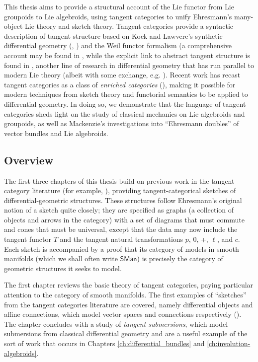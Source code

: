 This thesis aims to provide a structural account of the Lie functor from Lie groupoids to Lie algebroids, using tangent categories \cite{Cockett2014} to unify Ehresmann's many-object Lie theory and sketch theory. Tangent categories provide a syntactic description of tangent structure based on Kock and Lawvere's synthetic differential geometry (\cite{Kock2006}, \cite{Lawvere1979}) and the Weil functor formalism (a comprehensive account may be found in \cite{Kolar1993}, while the explicit link to abstract tangent structure is found in \cite{Leung2017}, another line of research in differential geometry that has run parallel to modern Lie theory (albeit with some exchange, e.g. \cite{kolar2007functorial}). Recent work has recast tangent categories as a class of \emph{enriched categories} (\cite{Garner2018}), making it possible for modern techniques from sketch theory and functorial semantics to be applied to differential geometry. In doing so, we demonstrate that the language of tangent categories sheds light on the study of classical mechanics on Lie algebroids and groupoids, as well as Mackenzie's investigations into ``Ehresmann doubles'' of vector bundles and Lie algebroids.

\subsection*{Overview}
The first three chapters of this thesis build on previous work in the tangent category literature (for example, \cite{Cockett2017,Cockett2018,LucyshynWright2018}), providing tangent-categorical sketches of differential-geometric structures.  These structures follow Ehresmann's original notion of a sketch quite closely; they are specified as graphs (a collection of objects and arrows in the category) with a set of diagrams that must commute and cones that must be universal, except that the data may now include the tangent functor $T$ and the tangent natural transformations $p$, 0, +, $\ell$, and $c$. Each sketch is accompanied by a proof that its category of models in smooth manifolds (which we shall often write $\mathsf{SMan}$) is precisely the category of geometric structures it seeks to model. 

The first chapter reviews the basic theory of tangent categories, paying particular attention to the category of smooth manifolds. The first examples of ``sketches'' from the tangent categories literature are covered, namely differential objects and affine connections, which model vector spaces and connections respectively (\cite{Cockett2017,Cockett2018}). The chapter concludes with a study of \emph{tangent submersions}, which model submersions from classical differential geometry and are a useful example of the sort of work that occurs in Chapters \ref{ch:differential_bundles} and \ref{ch:involution-algebroids}.

